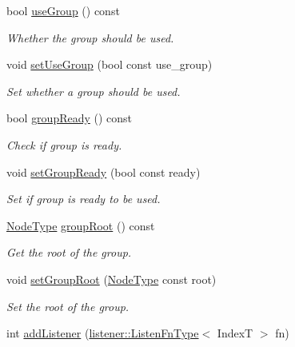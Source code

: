 \begin{DoxyCompactItemize}
bool \hyperlink{structvt_1_1vrt_1_1collection_1_1_holder_a937fec77df65d71ad2d6a7c70017c49f}{use\+Group} () const
\begin{DoxyCompactList}\small\item\em Whether the group should be used. \end{DoxyCompactList}\item 
void \hyperlink{structvt_1_1vrt_1_1collection_1_1_holder_ae169df5467202748f84a06f3b294c322}{set\+Use\+Group} (bool const use\+\_\+group)
\begin{DoxyCompactList}\small\item\em Set whether a group should be used. \end{DoxyCompactList}\item 
bool \hyperlink{structvt_1_1vrt_1_1collection_1_1_holder_a84bec2251b3eb324f9db28b979a7a51d}{group\+Ready} () const
\begin{DoxyCompactList}\small\item\em Check if group is ready. \end{DoxyCompactList}\item 
void \hyperlink{structvt_1_1vrt_1_1collection_1_1_holder_a4ca1b81daf55017c6f4a4cd584b761d5}{set\+Group\+Ready} (bool const ready)
\begin{DoxyCompactList}\small\item\em Set if group is ready to be used. \end{DoxyCompactList}\item 
\hyperlink{namespacevt_a866da9d0efc19c0a1ce79e9e492f47e2}{Node\+Type} \hyperlink{structvt_1_1vrt_1_1collection_1_1_holder_a26b8815a9a424b956e0cde211ea95545}{group\+Root} () const
\begin{DoxyCompactList}\small\item\em Get the root of the group. \end{DoxyCompactList}\item 
void \hyperlink{structvt_1_1vrt_1_1collection_1_1_holder_ac63fd92c5e7b93298fe464fcfcdbb1b6}{set\+Group\+Root} (\hyperlink{namespacevt_a866da9d0efc19c0a1ce79e9e492f47e2}{Node\+Type} const root)
\begin{DoxyCompactList}\small\item\em Set the root of the group. \end{DoxyCompactList}\item 
int \hyperlink{structvt_1_1vrt_1_1collection_1_1_holder_a501a01ffef66ba8606ec7d9a808b3892}{add\+Listener} (\hyperlink{namespacevt_1_1vrt_1_1collection_1_1listener_a62d04c44a3c187eae66bdba2090b4505}{listener\+::\+Listen\+Fn\+Type}$<$ IndexT $>$ fn)

\end{DoxyCompactItemize}
